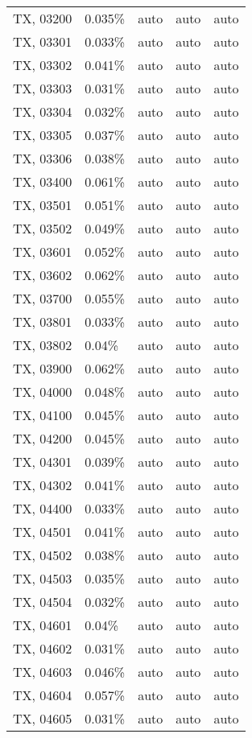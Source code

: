 \begin{longtable}[]{@{}lllll@{}}
TX, 03200 & 0.035\% & auto & auto & auto \\
TX, 03301 & 0.033\% & auto & auto & auto \\
TX, 03302 & 0.041\% & auto & auto & auto \\
TX, 03303 & 0.031\% & auto & auto & auto \\
TX, 03304 & 0.032\% & auto & auto & auto \\
TX, 03305 & 0.037\% & auto & auto & auto \\
TX, 03306 & 0.038\% & auto & auto & auto \\
TX, 03400 & 0.061\% & auto & auto & auto \\
TX, 03501 & 0.051\% & auto & auto & auto \\
TX, 03502 & 0.049\% & auto & auto & auto \\
TX, 03601 & 0.052\% & auto & auto & auto \\
TX, 03602 & 0.062\% & auto & auto & auto \\
TX, 03700 & 0.055\% & auto & auto & auto \\
TX, 03801 & 0.033\% & auto & auto & auto \\
TX, 03802 & 0.04\% & auto & auto & auto \\
TX, 03900 & 0.062\% & auto & auto & auto \\
TX, 04000 & 0.048\% & auto & auto & auto \\
TX, 04100 & 0.045\% & auto & auto & auto \\
TX, 04200 & 0.045\% & auto & auto & auto \\
TX, 04301 & 0.039\% & auto & auto & auto \\
TX, 04302 & 0.041\% & auto & auto & auto \\
TX, 04400 & 0.033\% & auto & auto & auto \\
TX, 04501 & 0.041\% & auto & auto & auto \\
TX, 04502 & 0.038\% & auto & auto & auto \\
TX, 04503 & 0.035\% & auto & auto & auto \\
TX, 04504 & 0.032\% & auto & auto & auto \\
TX, 04601 & 0.04\% & auto & auto & auto \\
TX, 04602 & 0.031\% & auto & auto & auto \\
TX, 04603 & 0.046\% & auto & auto & auto \\
TX, 04604 & 0.057\% & auto & auto & auto \\
TX, 04605 & 0.031\% & auto & auto & auto \\

\end{longtable}
